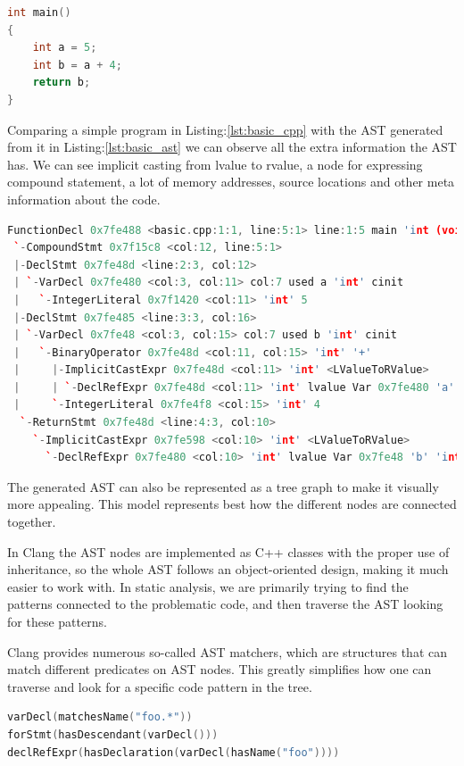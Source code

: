 \begin{lstlisting}[language=c++,frame=single, caption={A simple C++ program}, label={lst:basic_cpp}]
int main()
{
	int a = 5;
	int b = a + 4;
	return b;
}
\end{lstlisting}
\par Comparing a simple program in Listing:\ref{lst:basic_cpp} with the AST generated from it in Listing:\ref{lst:basic_ast} we can observe all the extra information the AST has. We can see implicit casting from lvalue to rvalue, a node for expressing compound statement, a lot of memory addresses, source locations and other meta information about the code.
\begin{lstlisting}[basicstyle=\scriptsize, language=c++,frame=single, caption={AST generated}, style=ast, label={lst:basic_ast}]
FunctionDecl 0x7fe488 <basic.cpp:1:1, line:5:1> line:1:5 main 'int (void)'
 `-CompoundStmt 0x7f15c8 <col:12, line:5:1>
 |-DeclStmt 0x7fe48d <line:2:3, col:12>
 | `-VarDecl 0x7fe480 <col:3, col:11> col:7 used a 'int' cinit
 |   `-IntegerLiteral 0x7f1420 <col:11> 'int' 5
 |-DeclStmt 0x7fe485 <line:3:3, col:16>
 | `-VarDecl 0x7fe48 <col:3, col:15> col:7 used b 'int' cinit
 |   `-BinaryOperator 0x7fe48d <col:11, col:15> 'int' '+'
 |     |-ImplicitCastExpr 0x7fe48d <col:11> 'int' <LValueToRValue>
 |     | `-DeclRefExpr 0x7fe48d <col:11> 'int' lvalue Var 0x7fe480 'a' 'int'
 |     `-IntegerLiteral 0x7fe4f8 <col:15> 'int' 4
  `-ReturnStmt 0x7fe48d <line:4:3, col:10>
    `-ImplicitCastExpr 0x7fe598 <col:10> 'int' <LValueToRValue>
      `-DeclRefExpr 0x7fe480 <col:10> 'int' lvalue Var 0x7fe48 'b' 'int'
\end{lstlisting}
\par The generated AST can also be represented as a tree graph to make it visually more appealing. This model represents best how the different nodes are connected together. \medskip
\par In Clang the AST nodes are implemented as C++ classes with the proper use of inheritance, so the whole AST follows an object-oriented design, making it much easier to work with. In static analysis, we are primarily trying to find the patterns connected to the problematic code, and then traverse the AST looking for these patterns. \medskip
\par Clang provides numerous so-called AST matchers\cite{ast_reference}, which are structures that can match different predicates on AST nodes. This greatly simplifies how one can traverse and look for a specific code pattern in the tree.
\begin{lstlisting}[language=c++,frame=single, caption={Basic AST matchers}, style=ast, label={lst:basic_match}]
varDecl(matchesName("foo.*"))
forStmt(hasDescendant(varDecl()))
declRefExpr(hasDeclaration(varDecl(hasName("foo"))))
\end{lstlisting}
